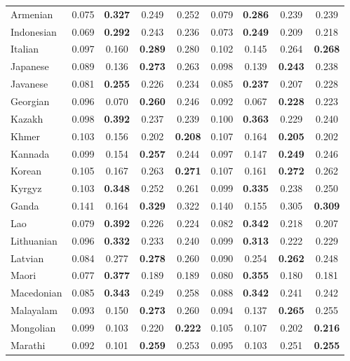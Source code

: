 \begin{longtable}{lcccccccc}
Armenian & 0.075 & \textbf{0.327} & 0.249 & 0.252 & 0.079 & \textbf{0.286} & 0.239 & 0.239 \\
Indonesian & 0.069 & \textbf{0.292} & 0.243 & 0.236 & 0.073 & \textbf{0.249} & 0.209 & 0.218 \\
Italian & 0.097 & 0.160 & \textbf{0.289} & 0.280 & 0.102 & 0.145 & 0.264 & \textbf{0.268} \\
Japanese & 0.089 & 0.136 & \textbf{0.273} & 0.263 & 0.098 & 0.139 & \textbf{0.243} & 0.238 \\
Javanese & 0.081 & \textbf{0.255} & 0.226 & 0.234 & 0.085 & \textbf{0.237} & 0.207 & 0.228 \\
Georgian & 0.096 & 0.070 & \textbf{0.260} & 0.246 & 0.092 & 0.067 & \textbf{0.228} & 0.223 \\
Kazakh & 0.098 & \textbf{0.392} & 0.237 & 0.239 & 0.100 & \textbf{0.363} & 0.229 & 0.240 \\
Khmer & 0.103 & 0.156 & 0.202 & \textbf{0.208} & 0.107 & 0.164 & \textbf{0.205} & 0.202 \\
Kannada & 0.099 & 0.154 & \textbf{0.257} & 0.244 & 0.097 & 0.147 & \textbf{0.249} & 0.246 \\
Korean & 0.105 & 0.167 & 0.263 & \textbf{0.271} & 0.107 & 0.161 & \textbf{0.272} & 0.262 \\
Kyrgyz & 0.103 & \textbf{0.348} & 0.252 & 0.261 & 0.099 & \textbf{0.335} & 0.238 & 0.250 \\
Ganda & 0.141 & 0.164 & \textbf{0.329} & 0.322 & 0.140 & 0.155 & 0.305 & \textbf{0.309} \\
Lao & 0.079 & \textbf{0.392} & 0.226 & 0.224 & 0.082 & \textbf{0.342} & 0.218 & 0.207 \\
Lithuanian & 0.096 & \textbf{0.332} & 0.233 & 0.240 & 0.099 & \textbf{0.313} & 0.222 & 0.229 \\
Latvian & 0.084 & 0.277 & \textbf{0.278} & 0.260 & 0.090 & 0.254 & \textbf{0.262} & 0.248 \\
Maori & 0.077 & \textbf{0.377} & 0.189 & 0.189 & 0.080 & \textbf{0.355} & 0.180 & 0.181 \\
Macedonian & 0.085 & \textbf{0.343} & 0.249 & 0.258 & 0.088 & \textbf{0.342} & 0.241 & 0.242 \\
Malayalam & 0.093 & 0.150 & \textbf{0.273} & 0.260 & 0.094 & 0.137 & \textbf{0.265} & 0.255 \\
Mongolian & 0.099 & 0.103 & 0.220 & \textbf{0.222} & 0.105 & 0.107 & 0.202 & \textbf{0.216} \\
Marathi & 0.092 & 0.101 & \textbf{0.259} & 0.253 & 0.095 & 0.103 & 0.251 & \textbf{0.255} \\

\end{longtable}
